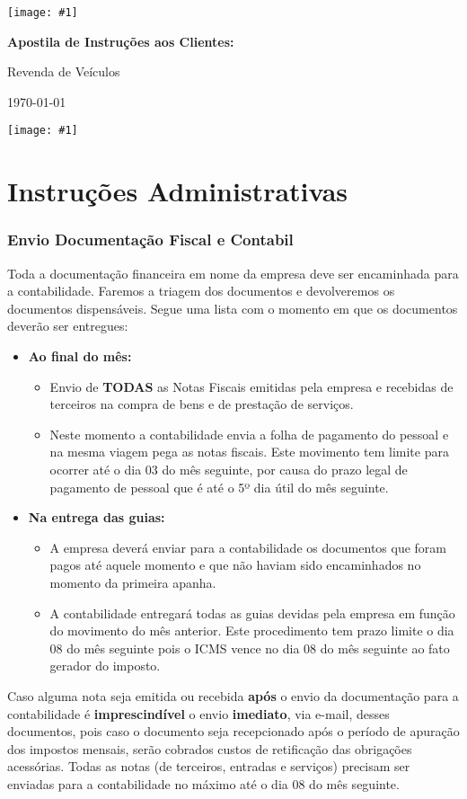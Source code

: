 \documentclass{article}
\newcommand{\imagem}[2]{
  \begin{center}
    \texttt{[image: \#1]}
  \end{center}
}
\newcommand{\pretextual}{
  \cleardoublepage
  \pagenumbering{roman}
}
\newcommand{\textual}{
  \cleardoublepage
  \pagenumbering{arabic}
}
\newcommand{\parte}[1]{
  \pagebreak
  \partfont{\centering}
  \imagem{logo}{0.4}
  \vspace*{\fill}
    \part{#1}
  \vspace*{\fill}
  \pagebreak
}
\newcommand{\capa}{
  {\thispagestyle{empty}
    \vspace*{\fill}
    \begin{center}
      \imagem{logo}{0.5}
      {\Huge \textbf{Apostila de Instruções aos Clientes:}} 
      \par\par
      {\huge Revenda de Veículos}
      \par\par
    \end{center}
    \vspace*{\fill}
    \begin{center}
      \today
    \end{center}
  }
  \pagebreak
}
\begin{document}
\singlespacing

\pretextual
\capa

\tableofcontents
\cleardoublepage

\textual

\parte{Instruções Administrativas}
\section{Envio Documentação Fiscal e Contabil}
\label{sec:doc-fin}
Toda a documentação financeira em nome da empresa deve ser encaminhada para a contabilidade. Faremos a triagem dos documentos e devolveremos os documentos dispensáveis. Segue uma lista com o momento em que os documentos deverão ser entregues:
\begin{itemize}
  \item \textbf{Ao final do mês:}
  \begin{itemize}
    \item Envio de \textbf{TODAS} as Notas Fiscais emitidas pela empresa e recebidas de terceiros na compra de bens e de prestação de serviços.
    \item Neste momento a contabilidade envia a folha de pagamento do pessoal e na mesma viagem pega as notas fiscais. Este movimento tem limite para ocorrer até o dia 03 do mês seguinte, por causa do prazo legal de pagamento de pessoal que é até o 5º dia útil do mês seguinte.
  \end{itemize}
  \item \textbf{Na entrega das guias:}
  \begin{itemize}
    \item A empresa deverá enviar para a contabilidade os documentos que foram pagos até aquele momento e que não haviam sido encaminhados no momento da primeira apanha.
    \item A contabilidade entregará todas as guias devidas pela empresa em função do movimento do mês anterior. Este procedimento tem prazo limite o dia 08 do mês seguinte pois o ICMS vence no dia 08 do mês seguinte ao fato gerador do imposto.
  \end{itemize}
\end{itemize}

\begin{tcolorbox}[title=Atenção!]
  Caso alguma nota seja emitida ou recebida \textbf{após} o envio da documentação para a contabilidade é \textbf{imprescindível} o envio \textbf{imediato}, via e-mail, desses documentos, pois caso o documento seja recepcionado após o período de apuração dos impostos mensais, serão cobrados custos de retificação das obrigações acessórias. Todas as notas (de terceiros, entradas e serviços) precisam ser enviadas para a contabilidade no máximo até o dia 08 do mês seguinte.
\end{tcolorbox}
\end{document}
